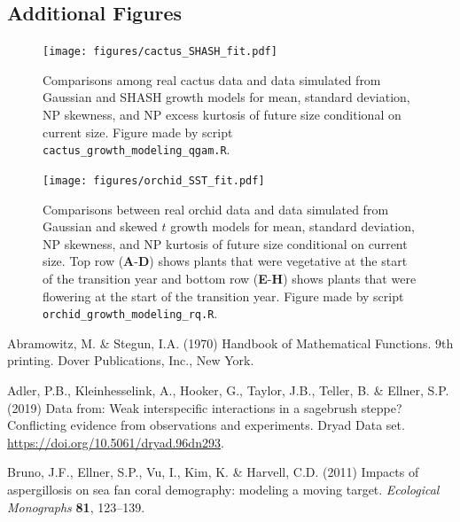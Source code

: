 \documentclass[12pt]{article}
\begin{document}
\begin{spacing}{1.35}
	\section{Additional Figures}
	\label{sec:additionalFigs}
	
	\begin{figure}[h!]
		\centering
		\texttt{[image: figures/cactus\_SHASH\_fit.pdf]}
		\caption{Comparisons among real cactus data and data simulated from Gaussian and SHASH growth models for mean, standard deviation, NP skewness, and NP excess kurtosis of future size conditional on current size. Figure made by script \texttt{cactus\_growth\_modeling\_qgam.R}.}
		\label{fig:cactus_fit}
	\end{figure} 
	
	\begin{figure}[h!]
		\centering
		\texttt{[image: figures/orchid\_SST\_fit.pdf]}
		\caption{Comparisons between real orchid data and data simulated from Gaussian and skewed $t$ growth models for mean, standard deviation, NP skewness, and NP kurtosis of future size conditional on current size. Top row (\textbf{A}-\textbf{D}) shows plants that were vegetative at the start of the transition year and bottom row (\textbf{E}-\textbf{H}) shows plants that were flowering at the start of the transition year. Figure made by script \texttt{orchid\_growth\_modeling\_rq.R}.}
		\label{fig:orchid_SST_fit}
	\end{figure} 
	
	\clearpage
	\newpage 
	
	\begin{thebibliography}{62}
		\providecommand{\natexlab}[1]{#1}
		
		Abramowitz, M. \& Stegun, I.A. (1970) {Handbook of Mathematical Functions. 9th printing.}
		{D}over Publications, Inc., New York.
		
		Adler, P.B., Kleinhesselink, A., Hooker, G., Taylor, J.B., Teller, B. \&
		Ellner, S.P. (2019) Data from: Weak interspecific interactions in a sagebrush
		steppe? {C}onflicting evidence from observations and experiments. {D}ryad
		{D}ata set. \url{https://doi.org/10.5061/dryad.96dn293}.
		
		Bruno, J.F., Ellner, S.P., Vu, I., Kim, K. \& Harvell, C.D. (2011) Impacts of
		aspergillosis on sea fan coral demography: modeling a moving target.
		\emph{Ecological Monographs} \textbf{81}, 123--139.
		

\end{thebibliography}
\end{spacing}
\end{document}
